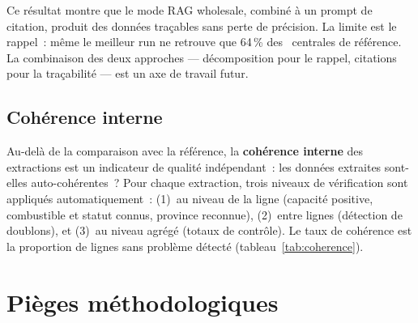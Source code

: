 \documentclass[a4paper,11pt]{report}
\begin{document}
Ce résultat montre que le mode RAG wholesale, combiné à un prompt de citation, produit des données traçables sans perte de précision. La limite est le rappel~: même le meilleur run ne retrouve que 64\,\% des \NumRefPlants{}~centrales de référence. La combinaison des deux approches --- décomposition pour le rappel, citations pour la traçabilité --- est un axe de travail futur.

\subsection{Cohérence interne}

Au-delà de la comparaison avec la référence, la \textbf{cohérence interne} des extractions est un indicateur de qualité indépendant~: les données extraites sont-elles auto-cohérentes~? Pour chaque extraction, trois niveaux de vérification sont appliqués automatiquement~: (1)~au niveau de la ligne (capacité positive, combustible et statut connus, province reconnue), (2)~entre lignes (détection de doublons), et (3)~au niveau agrégé (totaux de contrôle). Le taux de cohérence est la proportion de lignes sans problème détecté (tableau~\ref{tab:coherence}).





\section{Pièges méthodologiques}\label{sec:pitfalls}

%
%
\end{document}
